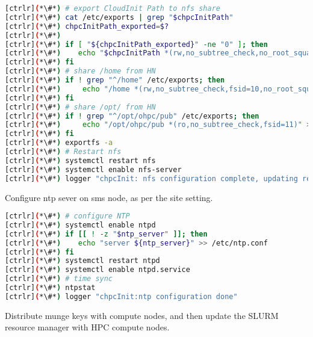 
\begin{lstlisting}[language=bash,keywords={}]
[ctrlr](*\#*) # export CloudInit Path to nfs share
[ctrlr](*\#*) cat /etc/exports | grep "$chpcInitPath"
[ctrlr](*\#*) chpcInitPath_exported=$?
[ctrlr](*\#*) 
[ctrlr](*\#*) if [ "${chpcInitPath_exported}" -ne "0" ]; then
[ctrlr](*\#*)    echo "$chpcInitPath *(rw,no_subtree_check,no_root_squash)" >> /etc/exports
[ctrlr](*\#*) fi
[ctrlr](*\#*) # share /home from HN
[ctrlr](*\#*) if ! grep "^/home" /etc/exports; then
[ctrlr](*\#*)     echo "/home *(rw,no_subtree_check,fsid=10,no_root_squash)" >> /etc/exports
[ctrlr](*\#*) fi
[ctrlr](*\#*) # share /opt/ from HN
[ctrlr](*\#*) if ! grep "^/opt/ohpc/pub" /etc/exports; then
[ctrlr](*\#*)     echo "/opt/ohpc/pub *(ro,no_subtree_check,fsid=11)" >> /etc/exports
[ctrlr](*\#*) fi
[ctrlr](*\#*) exportfs -a
[ctrlr](*\#*) # Restart nfs
[ctrlr](*\#*) systemctl restart nfs
[ctrlr](*\#*) systemctl enable nfs-server
[ctrlr](*\#*) logger "chpcInit: nfs configuration complete, updating remaining HPC configuration" 
\end{lstlisting} 

	Configure ntp sever on sms node, as per the site setting.


\begin{lstlisting}[language=bash,keywords={}]
[ctrlr](*\#*) # configure NTP
[ctrlr](*\#*) systemctl enable ntpd
[ctrlr](*\#*) if [[ ! -z "$ntp_server" ]]; then
[ctrlr](*\#*)    echo "server ${ntp_server}" >> /etc/ntp.conf
[ctrlr](*\#*) fi
[ctrlr](*\#*) systemctl restart ntpd
[ctrlr](*\#*) systemctl enable ntpd.service
[ctrlr](*\#*) # time sync
[ctrlr](*\#*) ntpstat
[ctrlr](*\#*) logger "chpcInit:ntp configuration done"
\end{lstlisting} 

	Distribute munge keys with compute nodes, and then update the SLURM resource manager with HPC compute nodes.



